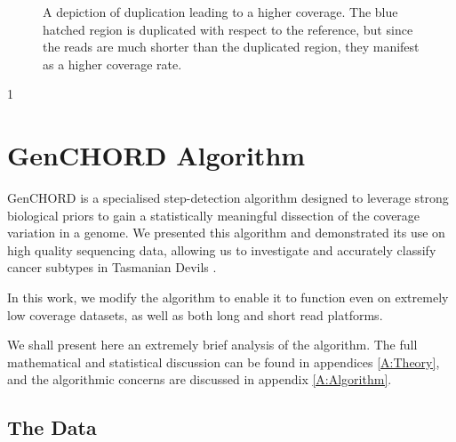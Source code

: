\documentclass[fleqn,usenatbib]{mnras}
\def\commentVisible{1}
\newcommand\comment[1]
{
	{
		\if\commentVisible1
			\color{red!70!black}
		\else
			\color{black}
		\fi

		#1
	}
}
\begin{document}
\begin{figure}
\begin{center}
{
				}
			\end{center}\caption{A depiction of duplication leading to a higher coverage. The blue hatched region is duplicated with respect to the reference, but since the reads are much shorter than the duplicated region, they manifest as a higher coverage rate.}\label{Fig:Diagram}
		\end{figure}

		\comment{
		\section{GenCHORD Algorithm}

			GenCHORD is a specialised step-detection algorithm designed to leverage strong biological priors to gain a statistically meaningful dissection of the coverage variation in a genome. We presented this algorithm and demonstrated its use on high quality sequencing data, allowing us to investigate and accurately classify cancer subtypes in Tasmanian Devils \citep{GenCHORD1}.
			
			In this work, we modify the algorithm to enable it to function even on extremely low coverage datasets, as well as both long and short read platforms. 

			We shall present here an extremely brief analysis of the algorithm. The full mathematical and statistical discussion can be found in appendices \ref{A:Theory}, and the algorithmic concerns are discussed in appendix \ref{A:Algorithm}.
		
		}
		\subsection{The Data}
\end{document}
